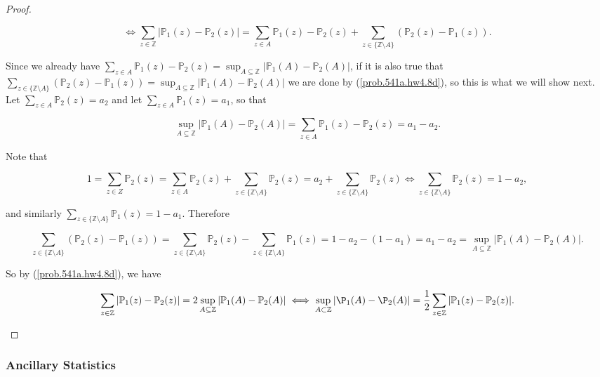 \begin{proof}
\begin{enumerate}[(a)]
\begin{equation}\label{prob.541a.hw4.8d}
\iff  \sum_{z \in \mathbb{Z}}|\mathbb{P}_1(z) - \mathbb{P}_2(z)| =  \sum_{z \in A}\mathbb{P}_1(z) - \mathbb{P}_2(z) +  \sum_{z \in \{\mathbb{Z} \setminus A\}}(\mathbb{P}_{2}(z)-\mathbb{P}_{1}(z)) .
\end{equation}
 
Since we already have \(  \sum_{z \in A}\mathbb{P}_1(z) - \mathbb{P}_2(z)  = \sup_{A\subseteq\mathbb{Z}}| \mathbb{P}_{1}(A)-\mathbb{P}_{2}(A)| \), if it is also true that \( \sum_{z \in \{\mathbb{Z} \setminus A\}}(\mathbb{P}_{2}(z)-\mathbb{P}_{1}(z))  =  \sup_{A\subseteq\mathbb{Z}}| \mathbb{P}_{1}(A)-\mathbb{P}_{2}(A)| \) we are done by (\ref{prob.541a.hw4.8d}), so this is what we will show next. Let \(\sum_{z \in A} \mathbb{P}_2(z) = a_2\) and let \(\sum_{z \in A} \mathbb{P}_1(z) = a_1\), so that 

\[
\sup_{A\subseteq\mathbb{Z}}| \mathbb{P}_{1}(A)-\mathbb{P}_{2}(A)|  = \sum_{z \in A}\mathbb{P}_1(z) - \mathbb{P}_2(z) = a_1 - a_2.
\]

Note that 

\[
1 = \sum_{z \in Z} \mathbb{P}_2(z) =   \sum_{z \in A} \mathbb{P}_2(z) +  \sum_{z \in \{\mathbb{Z} \setminus A\}} \mathbb{P}_2(z)  =   a_2 +  \sum_{z \in \{\mathbb{Z} \setminus A\}} \mathbb{P}_2(z) \iff  \sum_{z \in \{\mathbb{Z} \setminus A\}} \mathbb{P}_2(z)  = 1 - a_2,
\]

and similarly \( \sum_{z \in \{\mathbb{Z} \setminus A\}} \mathbb{P}_1(z) = 1 - a_1\). Therefore

\[
 \sum_{z \in \{\mathbb{Z} \setminus A\}}(\mathbb{P}_{2}(z)-\mathbb{P}_{1}(z))  =  \sum_{z \in \{\mathbb{Z} \setminus A\}}\mathbb{P}_{2}(z) -  \sum_{z \in \{\mathbb{Z} \setminus A\}}\mathbb{P}_{1}(z)= 1 - a_2 - (1 - a_1) = a_1 - a_2 = \sup_{A\subseteq\mathbb{Z}}| \mathbb{P}_{1}(A)-\mathbb{P}_{2}(A)| .
\]

So by (\ref{prob.541a.hw4.8d}), we have

\[
\sum_{z \in \mathbb{Z}}|\mathbb{P}_1(z) - \mathbb{P}_2(z)| = 2  \sup_{A\subseteq\mathbb{Z}}| \mathbb{P}_{1}(A)-\mathbb{P}_{2}(A)| \iff  \sup_{A\subset\mathbb{Z}}|\P_{1}(A)-\P_{2}(A)|=\frac{1}{2}\sum_{z \in \mathbb{Z}}|\mathbb{P}_1(z) - \mathbb{P}_2(z)|.
\]

\end{enumerate}


\end{proof}

\subsubsection{Ancillary Statistics}

